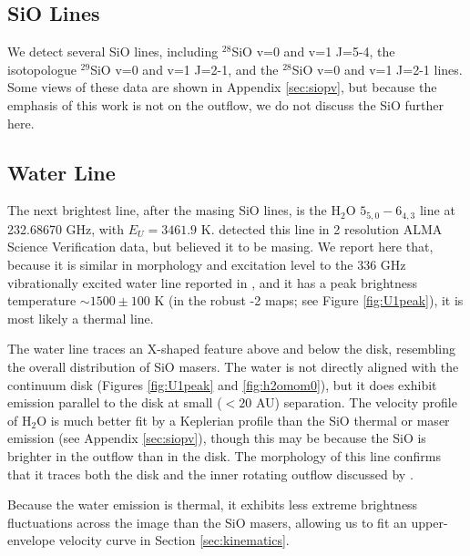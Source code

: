 \documentclass[twocolumn]{aastex61}
\let\oldarcsec\arcsec
\renewcommand\arcsec{\oldarcsec\xspace}%
\newcommand{\water}{H$_{2}$O\xspace}		%
\begin{document}
\subsection{SiO Lines}
We detect several SiO lines, including $^{28}$SiO v=0 and v=1 J=5-4,
the isotopologue $^{29}$SiO v=0 and v=1 J=2-1, and the $^{28}$SiO v=0 and v=1 J=2-1
lines.  Some views of these data are shown
in Appendix \ref{sec:siopv}, but because the emphasis of this work
is not on the outflow, we do not discuss the SiO further here.


\subsection{Water Line}
The next brightest line, after the masing SiO lines, is the \water
$5_{5,0}-6_{4,3}$ line at 232.68670 GHz, with $E_U=3461.9$ K.
\citet{Hirota2012a} detected this line in 2\arcsec resolution ALMA Science
Verification data, but believed it to be masing.  We report here that, because
it is similar in morphology and excitation level to the 336 GHz vibrationally
excited water line reported in \citet{Hirota2014a}, and it has a peak
brightness temperature $\sim1500\pm100$ K (in the robust -2 maps; see Figure
\ref{fig:U1peak}), it is most likely a thermal line.

The water line traces an X-shaped feature above and below the disk, resembling
the overall distribution of SiO masers.  The water is not directly aligned with
the continuum disk (Figures \ref{fig:U1peak} and \ref{fig:h2omom0}), but it
does exhibit emission parallel to the disk at small ($<20$ AU) separation.  The
velocity profile of \water is much better fit by a Keplerian profile than the
SiO thermal or maser emission (see Appendix \ref{sec:siopv}), though this may
be because the SiO is brighter in the outflow than in the disk.
The morphology of this line confirms that it traces both the disk and
the inner rotating outflow discussed by \citet{Hirota2017b} \citep[see
also][]{Kim2008a,Matthews2010a}.


Because the water emission is thermal, it exhibits less extreme
brightness fluctuations across the image than the SiO masers, allowing us to
fit an upper-envelope velocity curve in Section \ref{sec:kinematics}.

\end{document}
